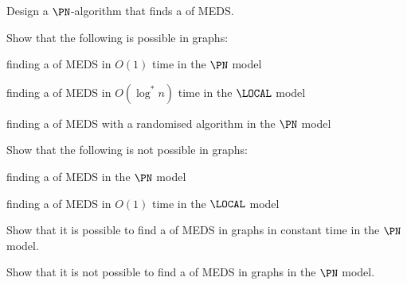 \begin{ex}\label{ex:edsfirst}
    Design a $\PN$-algorithm that finds a  of MEDS.
    
\end{ex}

\begin{ex}
    Show that the following is possible in  graphs:
    \begin{subex}
        \item finding a  of MEDS in $O(1)$ time in the $\PN$ model
        \item finding a  of MEDS in $O(\log^* n)$ time in the $\LOCAL$ model
        \item finding a  of MEDS with a randomised algorithm in the $\PN$ model
    \end{subex}
\end{ex}

\begin{exs}
    Show that the following is not possible in  graphs:
    \begin{subex}
        \item finding a  of MEDS in the $\PN$ model
        \item finding a  of MEDS in $O(1)$ time in the $\LOCAL$ model
    \end{subex}
\end{exs}

\begin{ex}
    Show that it is possible to find a  of MEDS in  graphs in constant time in the $\PN$ model.
    
\end{ex}

\begin{ex}
    Show that it is not possible to find a  of MEDS in  graphs in the $\PN$ model.
    
\end{ex}

